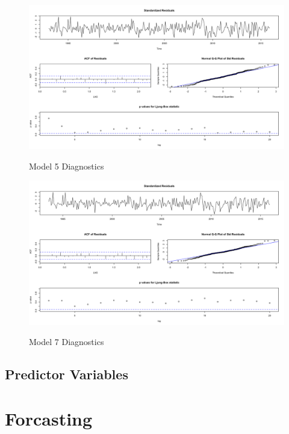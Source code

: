 \documentclass[twoside,twocolumn]{article}
\begin{document}
\begin{figure}[H]
      	\centering
      	\caption{Model 5 Diagnostics}
      	\includegraphics[width=\linewidth]{images/mod5}
      	\label{fig:mod5}
\end{figure}

\begin{figure}[H]
      	\centering
      	\caption{Model 7 Diagnostics}
      	\includegraphics[width=\linewidth]{images/mod7}
      	\label{fig:mod7}
\end{figure}

\subsection{Predictor Variables}

\blindtext %

\section{Forcasting}

\blindtext %
\end{document}
